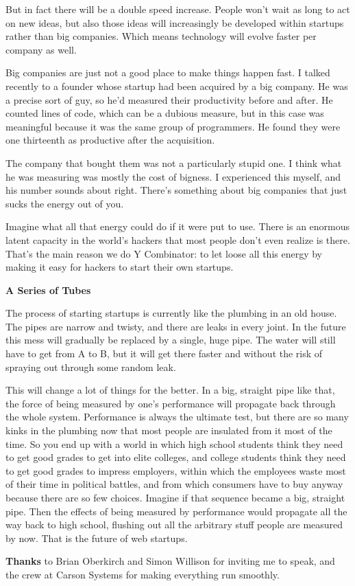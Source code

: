But in fact there will be a double speed increase. People won't wait as
long to act on new ideas, but also those ideas will increasingly be
developed within startups rather than big companies. Which means
technology will evolve faster per company as well.

Big companies are just not a good place to make things happen fast. I
talked recently to a founder whose startup had been acquired by a big
company. He was a precise sort of guy, so he'd measured their
productivity before and after. He counted lines of code, which can be a
dubious measure, but in this case was meaningful because it was the same
group of programmers. He found they were one thirteenth as productive
after the acquisition.

The company that bought them was not a particularly stupid one. I think
what he was measuring was mostly the cost of bigness. I experienced this
myself, and his number sounds about right. There's something about big
companies that just sucks the energy out of you.

Imagine what all that energy could do if it were put to use. There is an
enormous latent capacity in the world's hackers that most people don't
even realize is there. That's the main reason we do Y Combinator: to let
loose all this energy by making it easy for hackers to start their own
startups.

\textbf{A Series of Tubes}

The process of starting startups is currently like the plumbing in an
old house. The pipes are narrow and twisty, and there are leaks in every
joint. In the future this mess will gradually be replaced by a single,
huge pipe. The water will still have to get from A to B, but it will get
there faster and without the risk of spraying out through some random
leak.

This will change a lot of things for the better. In a big, straight pipe
like that, the force of being measured by one's performance will
propagate back through the whole system. Performance is always the
ultimate test, but there are so many kinks in the plumbing now that most
people are insulated from it most of the time. So you end up with a
world in which high school students think they need to get good grades
to get into elite colleges, and college students think they need to get
good grades to impress employers, within which the employees waste most
of their time in political battles, and from which consumers have to buy
anyway because there are so few choices. Imagine if that sequence became
a big, straight pipe. Then the effects of being measured by performance
would propagate all the way back to high school, flushing out all the
arbitrary stuff people are measured by now. That is the future of web
startups.

\textbf{Thanks} to Brian Oberkirch and Simon Willison for inviting me to
speak, and the crew at Carson Systems for making everything run
smoothly.
